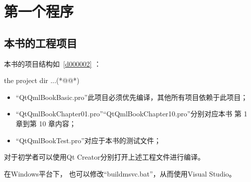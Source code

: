 ﻿




%

\FloatBarrier
\section{
第一个程序
}\label{s100210}


\FloatBarrier
\subsection{
本书的工程项目
}\label{ss001u10}


本书的项目结构如\treeindexnumbernameone\ \ref{d000002} ：
{}\label{d000002}    %
\begin{thebookfilesourceonepathtree}[escapeinside={(*@}{@*)},
caption=GoodLuck,
numbers=none,
title=\treeindexnumbernameone \thetreeindexnumber
]
the project dir ...(*@\marginpar[\hfill\setlength\fboxsep{2pt}\fbox{\footnotesize{\kaishu\parbox{1em}{\setlength{\baselineskip}{2pt}\treeindexnumbernameone}}\footnotesize{\thetreeindexnumber}}]{\setlength\fboxsep{2pt}\fbox{\footnotesize{\kaishu\parbox{1em}{\setlength{\baselineskip}{2pt}\treeindexnumbernameone}}\footnotesize{\thetreeindexnumber}}}@*)\end{thebookfilesourceonepathtree}          %
\addtocounter{lstlisting}{-1}   %


\begin{itemize}

\item “QtQmlBookBasic.pro”此项目必须优先编译，其他所有项目依赖于此项目；
\item “QtQmlBookChapter01.pro”\raisebox{0.16ex}{\sourcefonttwo\~{}}“QtQmlBookChapter10.pro”分别对应本书
第 1 章到第 10 章内容；
\item “QtQmlBookTest.pro”对应于本书的测试文件；

\end{itemize}

对于初学者可以使用Qt Creator分别打开上述工程文件进行编译。

在Windows平台下，
也可以修改“build\underline{\hspace{0.5em}}msvc.bat”，从而使用Visual Studio。

